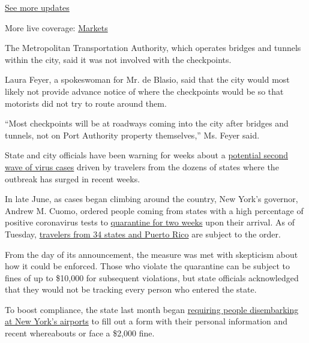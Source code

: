 \href{https://www.nytimes3xbfgragh.onion/2020/09/11/world/covid-19-coronavirus.html?action=click\&pgtype=Article\&state=default\&region=MAIN_CONTENT_1\&context=storylines_live_updates}{See
more updates}

More live coverage:
\href{https://www.nytimes3xbfgragh.onion/live/2020/09/11/business/stock-market-today-coronavirus?action=click\&pgtype=Article\&state=default\&region=MAIN_CONTENT_1\&context=storylines_live_updates}{Markets}

The Metropolitan Transportation Authority, which operates bridges and
tunnels within the city, said it was not involved with the checkpoints.

Laura Feyer, a spokeswoman for Mr. de Blasio, said that the city would
most likely not provide advance notice of where the checkpoints would be
so that motorists did not try to route around them.

``Most checkpoints will be at roadways coming into the city after
bridges and tunnels, not on Port Authority property themselves,'' Ms.
Feyer said.

State and city officials have been warning for weeks about a
\href{https://www.nytimes3xbfgragh.onion/2020/07/14/nyregion/coronavirus-ny-travel-cuomo.html?module=inline}{potential
second wave of virus cases} driven by travelers from the dozens of
states where the outbreak has surged in recent weeks.

In late June, as cases began climbing around the country, New York's
governor, Andrew M. Cuomo, ordered people coming from states with a high
percentage of positive coronavirus tests to
\href{https://www.nytimes3xbfgragh.onion/2020/06/24/nyregion/ny-coronavirus-states-quarantine.html?module=inline}{quarantine
for two weeks} upon their arrival. As of Tuesday,
\href{https://coronavirus.health.ny.gov/covid-19-travel-advisory}{travelers
from 34 states and Puerto Rico} are subject to the order.

From the day of its announcement, the measure was met with skepticism
about how it could be enforced. Those who violate the quarantine can be
subject to fines of up to \$10,000 for subsequent violations, but state
officials acknowledged that they would not be tracking every person who
entered the state.

To boost compliance, the state last month began
\href{https://www.nytimes3xbfgragh.onion/2020/07/14/nyregion/coronavirus-ny-travel-cuomo.html}{requiring
people disembarking at New York's airports} to fill out a form with
their personal information and recent whereabouts or face a \$2,000
fine.

